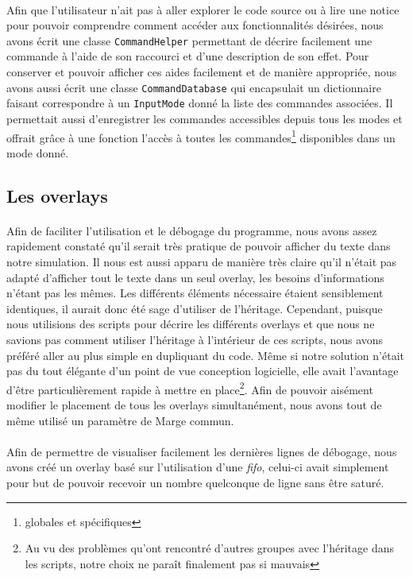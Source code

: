 \paragraph{}
Afin que l'utilisateur n'ait pas à aller explorer le code source ou à lire une
notice pour pouvoir comprendre comment accéder aux fonctionnalités désirées,
nous avons écrit une classe \verb!CommandHelper! permettant de décrire
facilement une commande à l'aide de son raccourci et d'une description de son
effet. Pour conserver et pouvoir afficher ces aides facilement et de manière
appropriée, nous avons aussi écrit une classe \verb!CommandDatabase! qui
encapsulait un dictionnaire faisant correspondre à un \verb!InputMode! donné
la liste des commandes associées. Il permettait aussi d'enregistrer les
commandes accessibles depuis tous les modes et offrait grâce à une fonction
l'accès à toutes les commandes\footnote{globales et spécifiques} disponibles
dans un mode donné.

\subsection{Les overlays}
\paragraph{}
Afin de faciliter l'utilisation et le débogage du programme, nous avons assez
rapidement constaté qu'il serait très pratique de pouvoir afficher du texte
dans notre simulation. Il nous est aussi apparu de manière très claire qu'il
n'était pas adapté d'afficher tout le texte dans un seul overlay, les besoins
d'informations n'étant pas les mêmes. Les différents éléments nécessaire
étaient sensiblement identiques, il aurait donc été sage d'utiliser de
l'héritage. Cependant, puisque nous utilisions des scripts pour décrire les
différents overlays et que nous ne savions pas comment utiliser l'héritage à
l'intérieur de ces scripts, nous avons préféré aller au plus simple en
dupliquant du code. Même si notre solution n'était pas du tout élégante d'un
point de vue conception logicielle, elle avait l'avantage d'être
particulièrement rapide à mettre en place\footnote{Au vu des problèmes qu'ont
rencontré d'autres groupes avec l'héritage dans les scripts, notre choix ne
paraît finalement pas si mauvais}. Afin de pouvoir aisément modifier le
placement de tous les overlays simultanément, nous avons tout de même utilisé
un paramètre de Marge commun.

\paragraph{}
Afin de permettre de visualiser facilement les dernières lignes de débogage,
nous avons créé un overlay basé sur l'utilisation d'une {\em fifo}, celui-ci
avait simplement pour but de pouvoir recevoir un nombre quelconque de ligne
sans être saturé.

